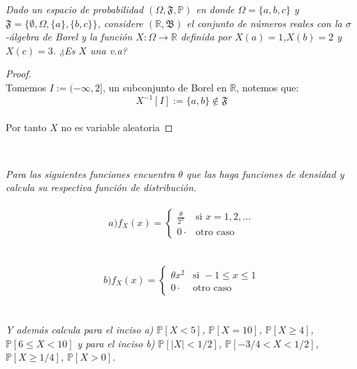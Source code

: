 \documentclass[11pt,letterpaper]{article}
\newcommand{\R}{\mathbb{R}}
\begin{document}
\begin{tcolorbox}[ 
	title = \textcolor{black}{\textcolor{white}{Problema 1}},]
\textit{Dado un espacio de probabilidad $(\Omega,\mathfrak{F}  ,\mathbb{P})$ en donde
  $\Omega=\{a,b,c\}$ y $\mathfrak{F} =\{\emptyset,\Omega,\{a\},\{b,c\}\}$,
  considere $(\R,\mathfrak{B} )$ el conjunto de n\'umeros reales con la
  $\sigma$-\'algebra de Borel y la funci\'on $X:\Omega\to\R$ definida
  por $X(a)=1$,$X(b)=2$ y $X(c)=3$. ¿Es $X$ una v.a?}
\end{tcolorbox}
\begin{proof}\,\\
  Tomemos $I:=(-\infty,2]$, un subconjunto de Borel en $\R$, notemos que:\,\\
  \begin{equation*}
    X^{-1}[I]:=\{a,b\}\notin \mathfrak{F} 
  \end{equation*}\,\\
  Por tanto $X$ no es variable aleatoria
\end{proof}\,\\
\begin{tcolorbox}[ 
	title = \textcolor{black}{\textcolor{white}{Problema 2}},]
\textit{Para las siguientes funciones  encuentra $\theta$ que las haga funciones de densidad y calcula su respectiva funci\'on de distribuci\'on.\,\\
\,\\
\begin{equation*}
    a)f_X(x)=\begin{cases} 
      \frac{\theta}{2^x}              & \mbox{si } x=1,2,\dots   \\
      0 \cdot                         & \text{otro caso}
   \end{cases}
\end{equation*}\,\\
\,\\
\begin{equation*}
    b)f_X(x)=\begin{cases} 
      \theta x^2             & \mbox{si } -1\leq x\leq 1  \\
      0 \cdot                         & \text{otro caso}
   \end{cases}
\end{equation*}\,\\
\,\\
Y adem\'as calcula para el inciso a) $\mathbb{P}[X<5]$, $\mathbb{P}[X=10]$, $\mathbb{P}[X\geq 4]$, $\mathbb{P}[6\leq X<10]$ y para el inciso b) $\mathbb{P}[|X|<1/2]$, $\mathbb{P}[-3/4<X<1/2]$, $\mathbb{P}[X\geq 1/4]$, $\mathbb{P}[X>0]$.
}
\end{tcolorbox}
\end{document}
